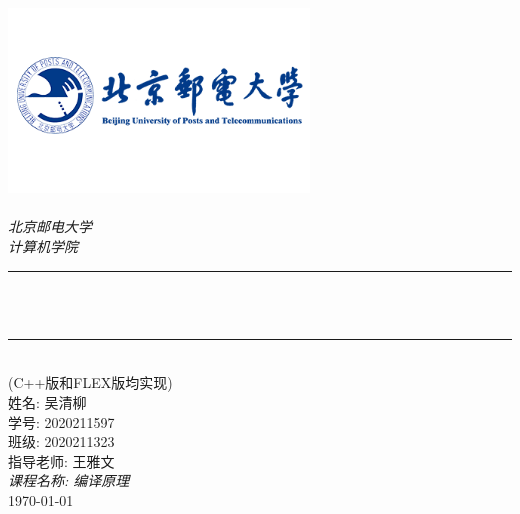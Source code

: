 \begin{titlepage}
    \newcommand{\HRule}{\rule{\linewidth}{0.5mm}}
    \includegraphics[width=8cm]{title/logo_bupt.png}\\[1cm]
    \center
    \quad\\[1.5cm]
    \textsl{\Large 北京邮电大学}\\[0.5cm]
    \textsl{\large  计算机学院}\\[0.5cm]
    \makeatletter
    \HRule \\[0.4cm]
    {\huge \bfseries \@title}\\[0.4cm]
    \HRule \\[1.5cm]
    \large {(C++版和FLEX版均实现)}\\[2cm]
    \makeatother
    {\large 姓名: 吴清柳}\\[0.5cm]
    {\large 学号: 2020211597}\\[0.5cm]
    {\large 班级: 2020211323}\\[0.5cm]
    {\large 指导老师: 王雅文}\\[0.5cm]
    {\large \emph{课程名称: 编译原理}}\\[0.5cm]
    {\large \today}\\[2cm]
    \vfill
\end{titlepage}
